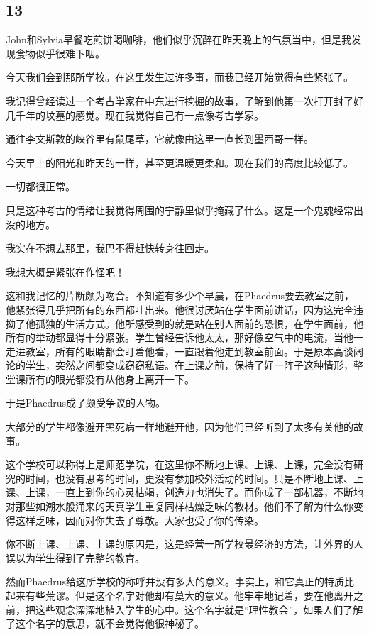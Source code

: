 \documentclass[UTF8]{article}
\begin{document}
\subsection*{13}
\par John和Sylvia早餐吃煎饼喝咖啡，他们似乎沉醉在昨天晚上的气氛当中，但是我发现食物似乎很难下咽。
\par 今天我们会到那所学校。在这里发生过许多事，而我已经开始觉得有些紧张了。
\par 我记得曾经读过一个考古学家在中东进行挖掘的故事，了解到他第一次打开封了好几千年的坟墓的感觉。现在我觉得自己有一点像考古学家。
\par 通往李文斯敦的峡谷里有鼠尾草，它就像由这里一直长到墨西哥一样。
\par 今天早上的阳光和昨天的一样，甚至更温暖更柔和。现在我们的高度比较低了。
\par 一切都很正常。
\par 只是这种考古的情绪让我觉得周围的宁静里似乎掩藏了什么。这是一个鬼魂经常出没的地方。
\par 我实在不想去那里，我巴不得赶快转身往回走。
\par 我想大概是紧张在作怪吧！
\par 这和我记忆的片断颇为吻合。不知道有多少个早晨，在Phaedrus要去教室之前，他紧张得几乎把所有的东西都吐出来。他很讨厌站在学生面前讲话，因为这完全违拗了他孤独的生活方式。他所感受到的就是站在别人面前的恐惧，在学生面前，他所有的举动都显得十分紧张。学生曾经告诉他太太，那好像空气中的电流，当他一走进教室，所有的眼睛都会盯着他看，一直跟着他走到教室前面。于是原本高谈阔论的学生，突然之间都变成窃窃私语。在上课之前，保持了好一阵子这种情形，整堂课所有的眼光都没有从他身上离开一下。
\par 于是Phaedrus成了颇受争议的人物。
\par 大部分的学生都像避开黑死病一样地避开他，因为他们已经听到了太多有关他的故事。
\par 这个学校可以称得上是师范学院，在这里你不断地上课、上课、上课，完全没有研究的时间，也没有思考的时间，更没有参加校外活动的时间。只是不断地上课、上课、上课，一直上到你的心灵枯竭，创造力也消失了。而你成了一部机器，不断地对那些如潮水般涌来的天真学生重复同样枯燥乏味的教材。他们不了解为什么你变得这样乏味，因而对你失去了尊敬。大家也受了你的传染。
\par 你不断上课、上课、上课的原因是，这是经营一所学校最经济的方法，让外界的人误以为学生得到了完整的教育。
\par 然而Phaedrus给这所学校的称呼并没有多大的意义。事实上，和它真正的特质比起来有些荒谬。但是这个名字对他却有莫大的意义。他牢牢地记着，要在他离开之前，把这些观念深深地植入学生的心中。这个名字就是“理性教会”，如果人们了解了这个名字的意思，就不会觉得他很神秘了。
\end{document}
